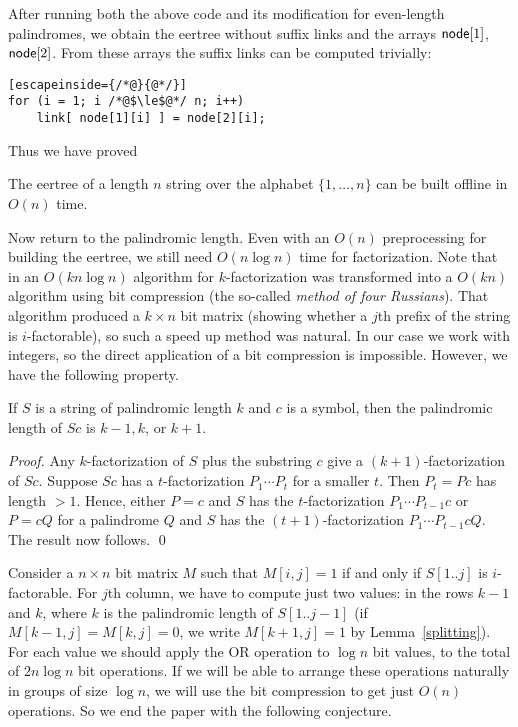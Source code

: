\documentclass{llncs}
\def\nod{{\sf node}}
\begin{document}
After running both the above code and its modification for even-length palindromes, we obtain the eertree without suffix links and the arrays $\nod[1]$, $\nod[2]$. From these arrays the suffix links can be computed trivially:

\begin{lstlisting}[escapeinside={/*@}{@*/}]
for (i = 1; i /*@$\le$@*/ n; i++)
	link[ node[1][i] ] = node[2][i];
\end{lstlisting}

Thus we have proved

\begin{proposition}
The eertree of a length $n$ string over the alphabet $\{1,\ldots,n\}$ can be built offline in $O(n)$ time. 
\end{proposition}

Now return to the palindromic length. Even with an $O(n)$ preprocessing for building the eertree, we still need $O(n\log n)$ time for factorization. Note that in \cite{KRS15} an $O(k n \log n)$ algorithm for $k$-factorization was transformed into a $O(kn)$ algorithm using bit compression (the so-called \emph{method of four Russians}). That algorithm produced a $k\times n$ bit matrix (showing whether a $j$th prefix of the string is $i$-factorable), so such a speed up method was natural. In our case we work with integers, so the direct application of a bit compression is impossible. However, we have the following property.

\begin{lemma}\label{splitting}
If $S$ is a string of palindromic length $k$ and $c$ is a symbol, then the palindromic length of $Sc$ is $k{-}1, k$, or $k{+}1$.
\end{lemma}

\begin{proof}
Any $k$-factorization of $S$ plus the substring $c$ give a $(k{+}1)$-factorization of $Sc$. Suppose $Sc$ has a $t$-factorization $P_1\cdots P_t$ for a smaller $t$. Then $P_t=Pc$ has length $>1$. Hence, either $P=c$ and $S$ has the $t$-factorization $P_1\cdots P_{t-1}c$ or $P=cQ$ for a palindrome $Q$ and $S$ has the $(t{+}1)$-factorization $P_1\cdots P_{t-1}cQ$. The result now follows. \qed
\end{proof}

Consider a $n\times n$ bit matrix $M$ such that $M[i,j]=1$ if and only if $S[1..j]$ is $i$-factorable. For $j$th column, we have to compute just two values: in the rows $k{-}1$ and $k$, where $k$ is the palindromic length of $S[1..j{-}1]$ (if $M[k{-}1,j]=M[k,j]=0$, we write $M[k{+}1,j]=1$ by Lemma~\ref{splitting}). For each value we should apply the OR operation to $\log n$ bit values, to the total of $2n \log n$ bit operations. If we will be able to arrange these operations naturally in groups of size $\log n$, we will use the bit compression to get just $O(n)$ operations. So we end the paper with the following conjecture.
\end{document}
